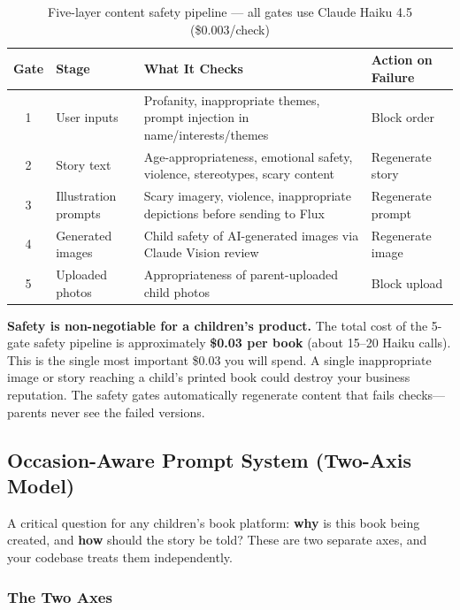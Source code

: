 \documentclass[12pt, letterpaper, oneside]{book}
\begin{document}
\begin{table}[H]
\centering
\small
\begin{tabularx}{\textwidth}{clXl}
\toprule
\textbf{Gate} & \textbf{Stage} & \textbf{What It Checks} & \textbf{Action on Failure} \\
\midrule
1 & User inputs & Profanity, inappropriate themes, prompt injection in name/interests/themes & Block order \\
2 & Story text & Age-appropriateness, emotional safety, violence, stereotypes, scary content & Regenerate story \\
3 & Illustration prompts & Scary imagery, violence, inappropriate depictions before sending to Flux & Regenerate prompt \\
4 & Generated images & Child safety of AI-generated images via Claude Vision review & Regenerate image \\
5 & Uploaded photos & Appropriateness of parent-uploaded child photos & Block upload \\
\bottomrule
\end{tabularx}
\caption{Five-layer content safety pipeline --- all gates use Claude Haiku 4.5 (\$0.003/check)}
\end{table}

\begin{warningbox}
\textbf{Safety is non-negotiable for a children's product.} The total cost of the 5-gate safety pipeline is approximately \textbf{\$0.03 per book} (about 15--20 Haiku calls). This is the single most important \$0.03 you will spend. A single inappropriate image or story reaching a child's printed book could destroy your business reputation. The safety gates automatically regenerate content that fails checks---parents never see the failed versions.
\end{warningbox}

\subsection{Occasion-Aware Prompt System (Two-Axis Model)}

A critical question for any children's book platform: \textbf{why} is this book being created, and \textbf{how} should the story be told? These are two separate axes, and your codebase treats them independently.

\subsubsection*{The Two Axes}
\end{document}
